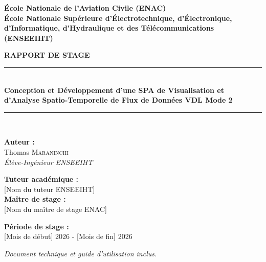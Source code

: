 \documentclass[a4paper,11pt]{report}
\begin{document}
\begin{titlepage}
    \centering
    \vspace*{1cm}
    
    {\large \textbf{École Nationale de l'Aviation Civile (ENAC)}} \\
    {\large \textbf{École Nationale Supérieure d'Électrotechnique, d'Électronique, d'Informatique, d'Hydraulique et des Télécommunications (ENSEEIHT)}}
    
    \vspace{2cm}
    
    {\LARGE \textbf{RAPPORT DE STAGE}}
    
    \vspace{1.5cm}
    
    \rule{\linewidth}{0.5mm} \\[0.4cm]
    {\huge \textbf{Conception et Développement d'une SPA de Visualisation et d'Analyse Spatio-Temporelle de Flux de Données VDL Mode 2}} \\
    \rule{\linewidth}{0.5mm} \\[1cm]
    
    \vspace{1.5cm}
    
    \begin{minipage}{0.45\textwidth}
        \begin{flushleft} \large
            \textbf{Auteur :}\\
            Thomas \textsc{Maraninchi} \\
            \textit{Élève-Ingénieur ENSEEIHT}
        \end{flushleft}
    \end{minipage}
    \hfill
    \begin{minipage}{0.45\textwidth}
        \begin{flushright} \large
            \textbf{Tuteur académique :} \\
            {[}Nom du tuteur ENSEEIHT{]} \\
            \vspace{0.5cm}
            \textbf{Maître de stage :} \\
            {[}Nom du maître de stage ENAC{]} \\
        \end{flushright}
    \end{minipage}

    \vfill

    {\large \textbf{Période de stage :}} \\
    {[}Mois de début{]} 2026 - {[}Mois de fin{]} 2026

    \vspace{1.5cm}
    
    \textit{Document technique et guide d'utilisation inclus.}
    
    \vspace{1cm}
\end{titlepage}
\end{document}
